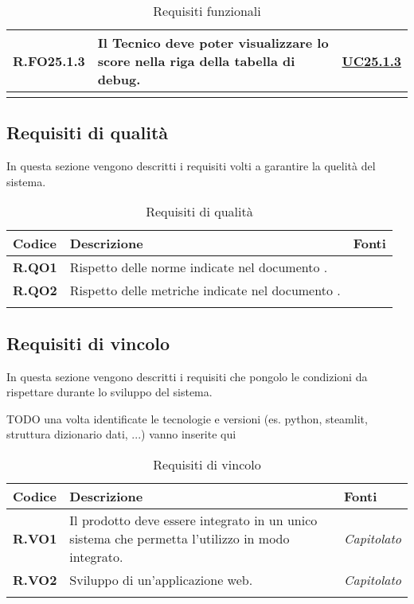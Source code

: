 \begin{longtable}{|P{3cm}|P{6,5cm}|>{\arraybackslash}P{4cm}|}
    \hline
    \textbf{R.FO25.1.3} & Il Tecnico deve poter visualizzare lo score nella riga della tabella di debug. &  \hyperref[UC25poin1point3]{UC25.1.3}\\
    \hline
\caption{Requisiti funzionali}
\label{requisitifunzionali}
\end{longtable}

\subsection{Requisiti di qualità}
In questa sezione vengono descritti i requisiti volti a garantire la quelità del sistema.

\begin{longtable}{|P{3cm}|P{6,5cm}|>{\arraybackslash}P{4cm}|}
  \hline
  \textbf{Codice} & \textbf{Descrizione} & \textbf{Fonti} \\
  \hline
  \textbf{R.QO1} & Rispetto delle norme indicate nel documento \NdP{}. & \NdP{} \\
  \hline
  \textbf{R.QO2} & Rispetto delle metriche indicate nel documento \PdQ{}. & \NdP{} \\
  \hline
\caption{Requisiti di qualità}
\label{requisitiqualita}
\end{longtable}

\subsection{Requisiti di vincolo}
In questa sezione vengono descritti i requisiti che pongolo le condizioni da rispettare durante lo sviluppo del sistema.

TODO una volta identificate le tecnologie e versioni (es. python, steamlit, struttura dizionario dati, ...) vanno inserite qui
\begin{longtable}{|P{3cm}|P{6,5cm}|>{\arraybackslash}P{4cm}|}
  \hline
  \textbf{Codice} & \textbf{Descrizione} & \textbf{Fonti} \\
  \hline
  \textbf{R.VO1} & Il prodotto deve essere integrato in un unico sistema che permetta l'utilizzo in modo integrato. & \emph{Capitolato} \\
  \hline
  \textbf{R.VO2} & Sviluppo di un'applicazione web. & \emph{Capitolato} \\
  \hline
\caption{Requisiti di vincolo}
\label{requisitivincolo}
\end{longtable}

